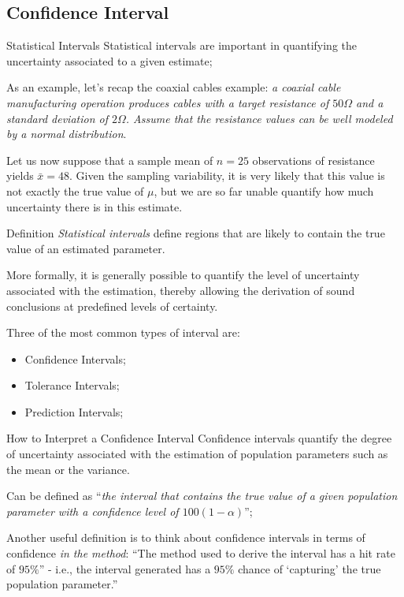 \subsection{Confidence Interval}

\begin{frame}{Statistical Intervals}
Statistical intervals are important in quantifying the uncertainty associated to a given estimate;
\bigskip

As an example, let's recap the coaxial cables example: \textit{a coaxial cable manufacturing operation produces cables with a target resistance of $50\Omega$ and a standard deviation of $2\Omega$. Assume that the resistance values can be well modeled by a normal distribution}.
\bigskip

Let us now suppose that a sample mean of $n=25$ observations of resistance  yields $\bar{x} = 48$. Given the sampling variability, it is very likely that this value is not exactly the true value of $\mu$, but we are so far unable quantify how much uncertainty there is in this estimate.
\end{frame}


\begin{frame}{Definition}
\textit{Statistical intervals} define regions that are likely to contain the true value of an estimated parameter.
\bigskip

More formally, it is generally possible to quantify the level of uncertainty associated with the estimation, thereby allowing the derivation of sound conclusions at predefined levels of certainty.
\bigskip

Three of the most common types of interval are:

\begin{itemize}
  \item Confidence Intervals;
  \item Tolerance Intervals;
  \item Prediction Intervals;
\end{itemize}
\end{frame}



\begin{frame}{How to Interpret a Confidence Interval}
Confidence intervals quantify the degree of uncertainty associated with the estimation of population parameters such as the mean or the variance.\bigskip

Can be defined as ``\textit{the interval that contains the true value of a given population parameter with a confidence level of $100(1-\alpha)$}'';\bigskip

Another useful definition is to think about confidence intervals in terms of confidence \textit{in the method}: ``The method used to derive the interval has a hit rate of $95\%$'' - i.e., the interval generated has a $95\%$ chance of `capturing' the true population parameter.''
\end{frame}

